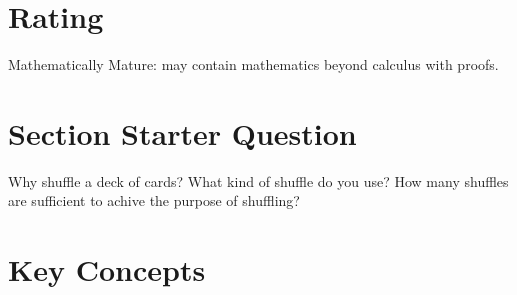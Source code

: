 \documentclass[12pt]{article}
\begin{document}
\myheader \mytitle

\hr


\hr

\usefirefox

\hr



\section*{Rating} %
Mathematically Mature:  may contain mathematics beyond calculus with
proofs. %

\hr

\section*{Section Starter Question}
Why shuffle a deck of cards?  What kind of shuffle do you use?  How
many shuffles are sufficient to achive the purpose of shuffling?

\hr

\section*{Key Concepts}
\end{document}
